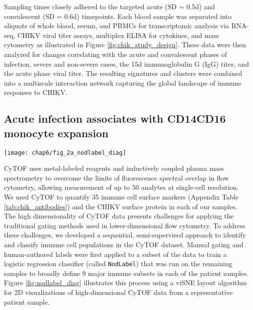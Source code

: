 Sampling times closely adhered to the targeted acute (SD = 0.5d) and convalescent (SD = 0.6d) timepoints. Each blood sample was separated into aliquots of whole blood, serum, and PBMCs for transcriptomic analysis via RNA-seq, CHIKV viral titer assays, multiplex ELISA for cytokines, and mass cytometry as illustrated in Figure \ref{fig:chik_study_design}. These data were then analyzed for changes correlating with the acute and convalescent phases of infection, severe and non-severe cases, the 15d immunoglobulin G (IgG) titer, and the acute phase viral titer. The resulting signatures and clusters were combined into a multiscale interaction network capturing the global landscape of immune responses to CHIKV.

\subsection{Acute infection associates with CD14\sups{+}\allowbreak CD16\sups{+} monocyte expansion}

\begin{figure*}[htb]
  \texttt{[image: chap6/fig\_2a\_nodlabel\_diag]}
  \caption[Overview of the \texttt{NodLabel} procedure]{\textbf{Overview of the \texttt{NodLabel} procedure}, using a viSNE layout of CyTOF single-cell events. Left side, point color indicates channel values for four example channels. Right side, traditional hierarchical gating was used on a subset of samples to identify 9 major immune compartments, which was then used to train a logistic regression classifier (Nod) that applied labels for canonical leukocyte phenotypes to all samples (NodLabel).
  }
  \label{fig:nodlabel_diag}
\end{figure*}

CyTOF uses metal-labeled reagents and inductively coupled plasma mass spectrometry to overcome the limits of fluorescence spectral overlap in flow cytometry, allowing measurement of up to 50 analytes at single-cell resolution. We used CyTOF to quantify 35 immune cell surface markers (Appendix Table \ref{tab:chik_antibodies}) and the CHIKV surface protein in each of our samples. The high dimensionality of CyTOF data presents challenges for applying the traditional gating methods used in lower-dimensional flow cytometry. To address these challenges, we developed a sequential, semi-supervised approach to identify and classify immune cell populations in the CyTOF dataset. Manual gating and human-authored labels were first applied to a subset of the data to train a logistic regression classifier (called \texttt{NodLabel}) that was run on the remaining samples to broadly define 9 major immune subsets in each of the patient samples. Figure \ref{fig:nodlabel_diag} illustrates this process using a viSNE layout algorithm\autocite{Amir2013} for 2D visualizations of high-dimensional CyTOF data from a representative patient sample.

